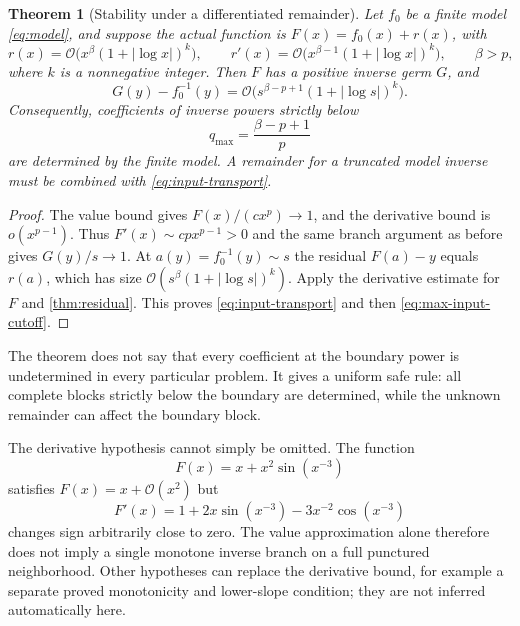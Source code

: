 \documentclass[11pt,a4paper]{article}
\numberwithin{equation}{section}
\newtheorem{theorem}{Theorem}[section]
\theoremstyle{definition}
\newcommand{\OO}{\mathcal O}
\begin{document}
\begin{theorem}[Stability under a differentiated remainder]
\label{thm:input-remainder}
Let $f_0$ be a finite model \eqref{eq:model}, and suppose the actual
function is $F(x)=f_0(x)+r(x)$, with
\begin{equation}\label{eq:input-contract}
 r(x)=\OO\bigl(x^\beta(1+|\log x|)^k\bigr),\qquad
 r'(x)=\OO\bigl(x^{\beta-1}(1+|\log x|)^k\bigr),
 \qquad \beta>p,
\end{equation}
where $k$ is a nonnegative integer. Then $F$ has a positive inverse germ
$G$, and
\begin{equation}\label{eq:input-transport}
 G(y)-f_0^{-1}(y)
 =\OO\bigl(s^{\beta-p+1}(1+|\log s|)^k\bigr).
\end{equation}
Consequently, coefficients of inverse powers strictly below
\begin{equation}\label{eq:max-input-cutoff}
 q_{\max}=\frac{\beta-p+1}{p}
\end{equation}
are determined by the finite model. A remainder for a truncated model
inverse must be combined with \eqref{eq:input-transport}.
\end{theorem}
\begin{proof}
The value bound gives $F(x)/(cx^p)\to1$, and the derivative bound is
$o(x^{p-1})$. Thus $F'(x)\sim cp x^{p-1}>0$ and the same branch argument
as before gives $G(y)/s\to1$. At $a(y)=f_0^{-1}(y)\sim s$ the residual
$F(a)-y$ equals $r(a)$, which has size
$\OO(s^\beta(1+|\log s|)^k)$. Apply the derivative estimate for $F$ and
\cref{thm:residual}. This proves \eqref{eq:input-transport} and then
\eqref{eq:max-input-cutoff}.
\end{proof}

The theorem does not say that every coefficient at the boundary power is
undetermined in every particular problem. It gives a uniform safe rule:
all complete blocks strictly below the boundary are determined, while the
unknown remainder can affect the boundary block.

The derivative hypothesis cannot simply be omitted. The function
\[
 F(x)=x+x^2\sin(x^{-3})
\]
satisfies $F(x)=x+\OO(x^2)$ but
\[
 F'(x)=1+2x\sin(x^{-3})-3x^{-2}\cos(x^{-3})
\]
changes sign arbitrarily close to zero. The value approximation alone
therefore does not imply a single monotone inverse branch on a full
punctured neighborhood. Other hypotheses can replace the derivative
bound, for example a separate proved monotonicity and lower-slope
condition; they are not inferred automatically here.
\end{document}
